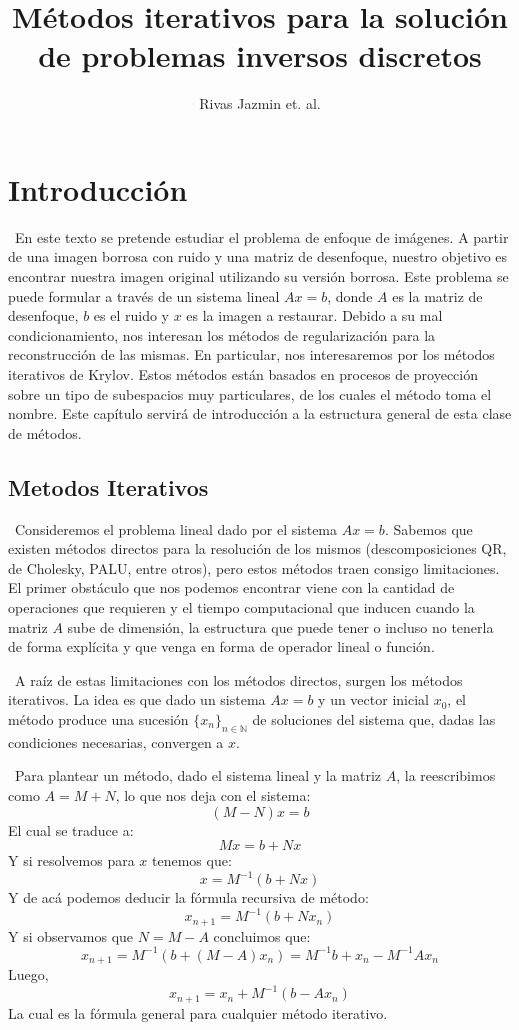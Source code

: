 \documentclass[12pt, oneside]{book}
\title{Métodos iterativos para la solución de problemas inversos discretos}
\author{Rivas Jazmin et. al.}
\date{}
\begin{document}
	\maketitle
	\tableofcontents
	
	
	\chapter{Introducción}
	\ En este texto se pretende estudiar el problema de enfoque de imágenes. A partir de una imagen borrosa con ruido y una matriz de desenfoque, nuestro objetivo es encontrar nuestra imagen original utilizando su versión borrosa. Este problema se puede formular a través de un sistema lineal $Ax = b$, donde $A$ es la matriz de desenfoque, $b$ es el ruido y $x$ es la imagen a restaurar. Debido a su mal condicionamiento, nos interesan los métodos de regularización para la reconstrucción de las mismas. En particular, nos interesaremos por los métodos iterativos de Krylov. Estos métodos están basados en procesos de proyección sobre un tipo de subespacios muy particulares, de los cuales el método toma el nombre. Este capítulo servirá de introducción a la estructura general de esta clase de métodos.
	
	
\section{Metodos Iterativos}
\ Consideremos el problema lineal dado por el sistema $Ax = b$. Sabemos que existen métodos directos para la resolución de los mismos (descomposiciones QR, de Cholesky, PALU, entre otros), pero estos métodos traen consigo limitaciones. El primer obstáculo que nos podemos encontrar viene con la cantidad de operaciones que requieren y el tiempo computacional que inducen cuando la matriz $A$ sube de dimensión, la estructura que puede tener o incluso no tenerla de forma explícita y que venga en forma de operador lineal o función.

\ A raíz de estas limitaciones con los métodos directos, surgen los métodos iterativos. La idea es que dado un sistema $Ax = b$ y un vector inicial $x_0$, el método produce una sucesión $\{x_n\}_{n \in \mathbb{N}}$ de soluciones del sistema que, dadas las condiciones necesarias, convergen a $x$.

\ Para plantear un método, dado el sistema lineal y la matriz $A$, la reescribimos como $A=M+N$, lo que nos deja con el sistema: $$(M-N)x=b$$ El cual se traduce a: $$Mx=b+Nx$$ Y si resolvemos para $x$ tenemos que: $$x=M^{-1}(b+Nx)$$ Y de acá podemos deducir la fórmula recursiva de método: $$x_{n+1}=M^{-1}(b+Nx_{n})$$ Y si observamos que $N=M-A$ concluimos que: $$x_{n+1}=M^{-1}(b+(M-A)x_{n})=M^{-1}b+x_n-M^{-1}Ax_n$$ Luego, $$x_{n+1}=x_n+M^{-1}(b-Ax_n)$$ La cual es la fórmula general para cualquier método iterativo.
\end{document}
